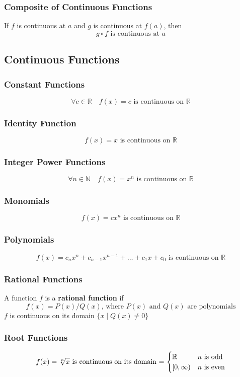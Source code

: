 \documentclass[../ma2002_notes.tex]{subfiles}
\begin{document}
\subsubsection{Composite of Continuous Functions}
If \(f\) is continuous at \(a\) and \(g\) is continuous at \(f(a)\), then
\[g\circ f\text{ is continuous at }a\]

\subsection{Continuous Functions}
\subsubsection{Constant Functions}
\[\forall c\in\mathbb{R}\quad f(x)=c\text{ is continuous on }\mathbb{R}\]

\subsubsection{Identity Function}
\[f(x)=x\text{ is continuous on }\mathbb{R}\]

\subsubsection{Integer Power Functions}
\[\forall n\in\mathbb{N}\quad f(x)=x^n\text{ is continuous on }\mathbb{R}\]

\subsubsection{Monomials}
\[f(x)=cx^n\text{ is continuous on }\mathbb{R}\]

\subsubsection{Polynomials}
\[f(x)=c_nx^n+c_{n-1}x^{n-1}+\ldots+c_1x+c_0\text{ is continuous on }\mathbb{R}\]

\subsubsection{Rational Functions}
A function \(f\) is a \textbf{rational function} if
\[f(x) = P(x)/Q(x)\text{, where }P(x)\text{ and }Q(x)\text{ are polynomials}\]
\(f\) is continuous on its domain \(\{x\mid Q(x)\ne0\}\)

\subsubsection{Root Functions}
\[f(x)=\sqrt[n]{x}\) is continuous on its domain = \(\begin{cases}
\mathbb{R} & n\text{ is odd} \\
[0,\infty) & n\text{ is even} \\
\end{cases}\]
\end{document}
